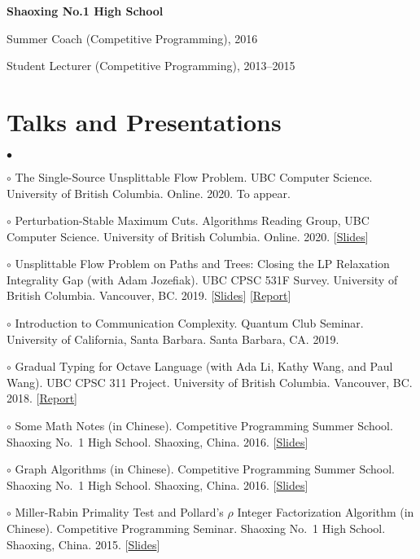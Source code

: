 \documentclass[margin,line]{res}
\newenvironment{list1}{
  \begin{list}{\ding{113}}{%
      \setlength{\itemsep}{0in}
      \setlength{\parsep}{0.025in} \setlength{\parskip}{0in}
      \setlength{\topsep}{0in} \setlength{\partopsep}{0in}
      \setlength{\leftmargin}{0.17in}}}{\end{list}}
\newenvironment{list2}{
  \begin{list}{$\bullet$}{%
      \setlength{\itemsep}{0in}
      \setlength{\parsep}{0in} \setlength{\parskip}{0in}
      \setlength{\topsep}{0in} \setlength{\partopsep}{0in}
      \setlength{\leftmargin}{0.2in}}}{\end{list}}
\begin{document}
\begin{resume}
{\bf Shaoxing No.1 High School}\\
\vspace*{-.1in}
\begin{list1}
\item[] Summer Coach (Competitive Programming), 2016
\item[] Student Lecturer (Competitive Programming), 2013--2015
\end{list1}


\section{\sc Talks and Presentations}

\begin{list2}
\item[$\circ$] The Single-Source Unsplittable Flow Problem. UBC Computer Science. University of British Columbia. Online. 2020. To appear.
\item[$\circ$] Perturbation-Stable Maximum Cuts. Algorithms Reading Group, UBC Computer Science. University of British Columbia. Online. 2020. [\href{http://ypan.me/docs/maxcut.pdf}{Slides}]
\item[$\circ$] Unsplittable Flow Problem on Paths and Trees: Closing the LP Relaxation Integrality Gap (with Adam Jozefiak). UBC CPSC 531F Survey. University of British Columbia. Vancouver, BC. 2019. [\href{http://ypan.me/docs/ufp-slides.pdf}{Slides}] [\href{http://ypan.me/docs/ufp-report.pdf}{Report}]
\item[$\circ$] Introduction to Communication Complexity. Quantum Club Seminar. University of California, Santa Barbara. Santa Barbara, CA. 2019.
\item[$\circ$] Gradual Typing for Octave Language (with Ada Li, Kathy Wang, and Paul Wang). UBC CPSC 311 Project. University of British Columbia. Vancouver, BC. 2018. [\href{http://ypan.me/docs/gradual-octave.pdf}{Report}]
\item[$\circ$] Some Math Notes (in Chinese). Competitive Programming Summer School. Shaoxing No.\ 1 High School. Shaoxing, China. 2016. [\href{http://ypan.me/docs/math.pdf}{Slides}]
\item[$\circ$] Graph Algorithms (in Chinese). Competitive Programming Summer School. Shaoxing No.\ 1 High School. Shaoxing, China. 2016. [\href{http://ypan.me/docs/graph.pdf}{Slides}]
\item[$\circ$] Miller-Rabin Primality Test and Pollard's $\rho$ Integer Factorization Algorithm (in Chinese). Competitive Programming Seminar. Shaoxing No.\ 1 High School. Shaoxing, China. 2015. [\href{http://ypan.me/docs/miller-rabin-pollard-rho.pdf}{Slides}]
\end{list2}



\end{resume}
\end{document}
